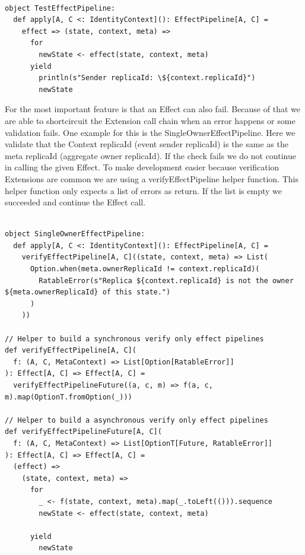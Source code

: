\documentclass[
	ngerman,
	ruledheaders=section,   %
	class=report,		    %
	thesis={type=bachelor}, %
	accentcolor=9c,			%
	custommargins=true,    %
	marginpar=false,        %
	parskip=half-,          %
	fontsize=11pt,          %
]{tudapub}
\begin{document}
\begin{lstlisting}

object TestEffectPipeline:
  def apply[A, C <: IdentityContext](): EffectPipeline[A, C] =
    effect => (state, context, meta) => 
      for
        newState <- effect(state, context, meta)
      yield
        println(s"Sender replicaId: \${context.replicaId}")
        newState

\end{lstlisting}

For the most important feature is that an Effect can also fail. Because of that we are able to shortcircuit the Extension call chain when an error happens or some validation fails. One example for this is the SingleOwnerEffectPipeline. Here we validate that the Context replicaId (event sender replicaId) is the same as the meta replicaId (aggregate owner replicaId). If the check fails we do not continue in calling the given Effect. To make development easier because verification Extensions are common we are using a verifyEffectPipeline helper function. This helper function only expects a list of errors as return. If the list is empty we succeeded and continue the Effect call.

\begin{lstlisting}
  
object SingleOwnerEffectPipeline:
  def apply[A, C <: IdentityContext](): EffectPipeline[A, C] =
    verifyEffectPipeline[A, C]((state, context, meta) => List(
      Option.when(meta.ownerReplicaId != context.replicaId)(
        RatableError(s"Replica ${context.replicaId} is not the owner ${meta.ownerReplicaId} of this state.")
      )
    ))

// Helper to build a synchronous verify only effect pipelines
def verifyEffectPipeline[A, C](
  f: (A, C, MetaContext) => List[Option[RatableError]]
): Effect[A, C] => Effect[A, C] =
  verifyEffectPipelineFuture((a, c, m) => f(a, c, m).map(OptionT.fromOption(_)))
  
// Helper to build a asynchronous verify only effect pipelines
def verifyEffectPipelineFuture[A, C](
  f: (A, C, MetaContext) => List[OptionT[Future, RatableError]]
): Effect[A, C] => Effect[A, C] =
  (effect) =>
    (state, context, meta) => 
      for
        _ <- f(state, context, meta).map(_.toLeft(())).sequence
        newState <- effect(state, context, meta)

      yield
        newState

\end{lstlisting}
\end{document}
